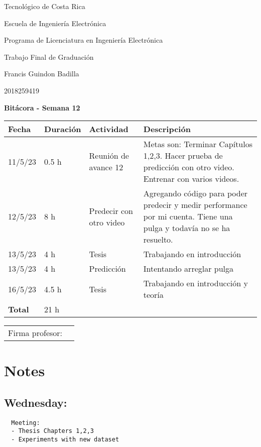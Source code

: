 \documentclass[12pt,oneside]{book}
\begin{document}
 \graphicspath{{./}{../tesis/fig/}}
  Tecnológico de Costa Rica
  \par\vspace{1mm}
  Escuela de Ingeniería Electrónica
  \par\vspace{1mm}
  Programa de Licenciatura en Ingeniería Electrónica
  \par\vspace{10mm}
  Trabajo Final de Graduación
  \par\vspace{1mm}
  Francis Guindon Badilla
  \par\vspace{1mm}
  2018259419
  \par\vspace{10mm}
  \large\textbf{Bitácora - Semana 12}
  \par\vspace{10mm}
  \small

  \begin{table} [!h]
    \centering
    \small
    \begin{tabular}{p{1.5 cm} p{2.1 cm} p{5 cm} p{8 cm}}
      \hline
      Fecha & Duración & Actividad & Descripción \\
      \hline
      11/5/23 & 0.5 h & Reunión de avance 12 & Metas son: Terminar Capítulos 1,2,3. Hacer prueba de predicción con otro video. Entrenar con varios videos.\\
      12/5/23 & 8 h & Predecir con otro video & Agregando código para poder predecir y medir performance por mi cuenta. Tiene una pulga y todavía no se ha resuelto. \\
      13/5/23 & 4 h & Tesis & Trabajando en introducción \\
      13/5/23 & 4 h & Predicción & Intentando arreglar pulga \\
      16/5/23 & 4.5 h & Tesis & Trabajando en introducción y teoría \\
      \hline
      \textbf{Total} & 21 h \\
      \hline
    \end{tabular}
  \end{table}
  
  \vfill

  \begin{tabular}{p{3 cm} p{10 cm}}
    Firma profesor: & \\
    \cline{2-2}
  \end{tabular}

  \newpage

  \section*{Notes}
  \setlength\parindent{0pt}

  \subsection*{Wednesday:}
  \begin{lstlisting}
  Meeting:
  - Thesis Chapters 1,2,3
  - Experiments with new dataset
  \end{lstlisting}

  \printbibliography[title={Bibliografía},heading=bibintoc]
\end{document}
